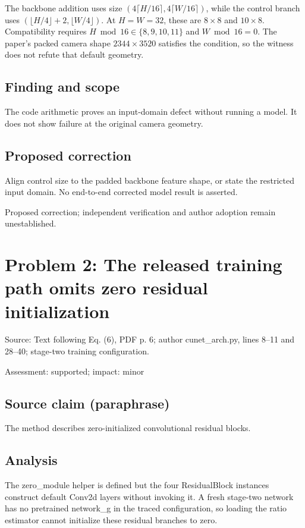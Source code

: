 \documentclass[11pt]{article}
\begin{document}
The backbone addition uses size \((4\lceil H/16\rceil,4\lceil W/16\rceil)\), while the control branch uses \((\lfloor H/4\rfloor+2,\lfloor W/4\rfloor)\). At \(H=W=32\), these are \(8\times8\) and \(10\times8\). Compatibility requires \(H\bmod16\in\{8,9,10,11\}\) and \(W\bmod16=0\). The paper's packed camera shape \(2344\times3520\) satisfies the condition, so the witness does not refute that default geometry.

\subsection*{Finding and scope}

The code arithmetic proves an input-domain defect without running a model. It does not show failure at the original camera geometry.

\subsection*{Proposed correction}

Align control size to the padded backbone feature shape, or state the restricted input domain. No end-to-end corrected model result is asserted.

Proposed correction; independent verification and author adoption remain unestablished.

\section*{Problem 2: The released training path omits zero residual initialization}

Source: Text following Eq. (6), PDF p. 6; author cunet\_arch.py, lines 8–11 and 28–40; stage-two training configuration.

Assessment: supported; impact: minor

\subsection*{Source claim (paraphrase)}

The method describes zero-initialized convolutional residual blocks.

\subsection*{Analysis}

The zero\_module helper is defined but the four ResidualBlock instances construct default Conv2d layers without invoking it. A fresh stage-two network has no pretrained network\_g in the traced configuration, so loading the ratio estimator cannot initialize these residual branches to zero.
\end{document}
